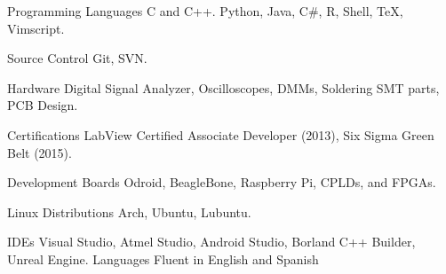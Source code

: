 
\begin{cvskills}


	\cvskill
		{Programming Languages}
			{C and C++. Python, Java, C\#, R, Shell, \TeX, Vimscript.}

	\cvskill
		{Source Control}
			{Git, SVN.}

	\cvskill
		{Hardware}
			{Digital Signal Analyzer, Oscilloscopes, DMMs, Soldering SMT parts, PCB Design.}

	\cvskill
		{Certifications}
			{LabView Certified Associate Developer (2013), Six Sigma Green Belt (2015).}

	\cvskill
		{Development Boards}
			{Odroid, BeagleBone, Raspberry Pi, CPLDs, and FPGAs.}

	\cvskill
		{Linux Distributions}
			{Arch, Ubuntu, Lubuntu.}

	\cvskill
		{IDEs}
			{Visual Studio, Atmel Studio, Android Studio, Borland C++ Builder, Unreal Engine.}
	\cvskill
		{Languages}
			{Fluent in English and Spanish}

\end{cvskills}

